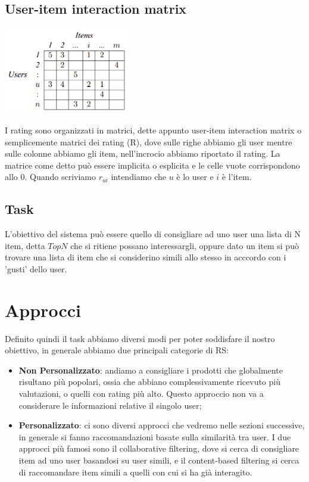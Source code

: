\subsection{User-item interaction matrix}
\begin{minipage}[H]{0.40\textwidth}
	\includegraphics[width=5.5cm]{figures/Sample-of-user-item-matrix}
\end{minipage}
\begin{minipage}[H]{0.55\textwidth}
	I rating sono organizzati in matrici, dette appunto user-item interaction matrix o semplicemente matrici dei rating (R), dove sulle righe abbiamo gli user mentre sulle colonne abbiamo gli item, nell'incrocio abbiamo riportato il rating. 
	La matrice come detto può essere implicita o esplicita e le celle vuote corrispondono allo 0.
	Quando scriviamo $r_{ui}$ intendiamo che $u$ è lo user e $i$ è l'item.
\end{minipage}

\subsection{Task}
L'obiettivo del sistema può essere quello di consigliare ad uno user una lista di N item, detta \textbf{$TopN$} che si ritiene possano interessargli, oppure dato un item si può trovare una lista di item che si considerino simili allo stesso in acccordo con i 'gusti' dello user.

\section{Approcci}
Definito quindi il task abbiamo diversi modi per poter soddisfare il nostro obiettivo, in generale abbiamo due principali categorie di RS:
\begin{itemize}
	\item \textbf{Non Personalizzato}: andiamo a consigliare i prodotti che globalmente risultano più popolari, ossia che abbiano complessivamente ricevuto più valutazioni, o quelli con rating più alto. Questo approccio non va a considerare le informazioni relative il singolo user;
	\item \textbf{Personalizzato}: ci sono diversi approcci che vedremo nelle sezioni successive, in generale si fanno raccomandazioni basate sulla similarità tra user. I due approcci più famosi sono il collaborative filtering, dove si cerca di consigliare item ad uno user basandosi su user simili, e il content-based filtering si cerca di raccomandare item simili a quelli con cui si ha già interagito.
\end{itemize}

